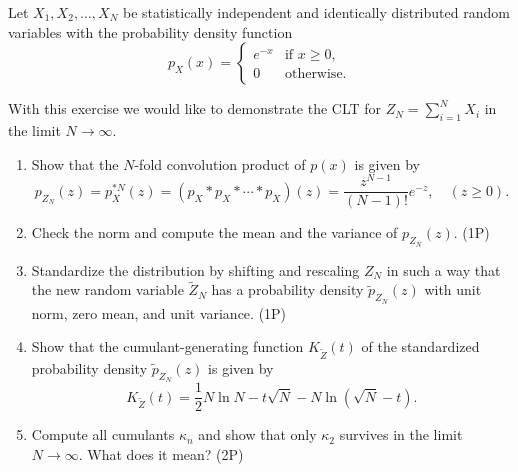 \begin{Problem}
	Let $X_1, X_2, \dots, X_N$ be statistically independent and identically distributed random variables with the probability density function
	\[
	p_X(x) =
	\begin{cases}
		e^{-x} & \text{if } x \ge 0, \\
		0 & \text{otherwise}.
	\end{cases}
	\]
	
	With this exercise we would like to demonstrate the CLT for $Z_N = \sum_{i=1}^N X_i$ in the limit $N \to \infty$.
	
	\begin{enumerate}
		\item[(a)] Show that the $N$-fold convolution product of $p(x)$ is given by
		\[
		p_{Z_N}(z) = p_X^{*N}(z) = (p_X * p_X * \cdots * p_X)(z)
		= \frac{z^{N-1}}{(N-1)!} e^{-z}, \quad (z \ge 0).
		\]
		
		\item[(b)] Check the norm and compute the mean and the variance of $p_{Z_N}(z)$. (1P)
		
		\item[(c)] Standardize the distribution by shifting and rescaling $Z_N$ in such a way that the new random variable $\tilde{Z}_N$ has a probability density $\tilde{p}_{Z_N}(z)$ with unit norm, zero mean, and unit variance. (1P)
		
		\item[(d)] Show that the cumulant-generating function $K_{\tilde{Z}}(t)$ of the standardized probability density $\tilde{p}_{Z_N}(z)$ is given by
		\[
		K_{\tilde{Z}}(t) = \frac{1}{2} N \ln N - t\sqrt{N} - N \ln(\sqrt{N} - t).
		\]
		
		\item[(e)] Compute all cumulants $\kappa_n$ and show that only $\kappa_2$ survives in the limit $N \to \infty$. What does it mean? (2P)
	\end{enumerate}
\end{Problem}
